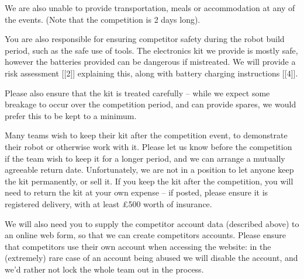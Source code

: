\documentclass[a4paper]{article}
\begin{document}
We are also unable to provide transportation, meals or accommodation  at
any of the events. (Note that the competition is 2 days long).

You are also responsible for ensuring competitor safety during the robot
build period, such as the safe use of tools. The electronics kit we
provide is mostly safe, however the batteries provided can be dangerous
if mistreated. We will provide a risk assessment [[2]] explaining this,
along with battery charging instructions [[4]].

Please also ensure that the kit is treated carefully -- while we expect
some breakage to occur over the competition period, and can provide
spares, we would prefer this to be kept to a minimum.

Many teams wish to keep their kit after the competition event, to
demonstrate their robot or otherwise work with it. Please let us know
before the competition if the team wish to keep it for a longer period,
and we can arrange a mutually agreeable return date. Unfortunately, we
are not in a position to let anyone keep the kit permanently, or sell
it. If you keep the kit after the competition, you will need to return
the kit at your own expense -- if posted, please ensure it is registered
delivery, with at least £500 worth of insurance.

We will also need you to supply the competitor account data (described
above) to an online web form, so that we can create competitors
accounts. Please ensure that competitors use their own account when
accessing the website: in the (extremely) rare case of an account being
abused we will disable the account, and we'd rather not lock the whole
team out in the process.
\end{document}
